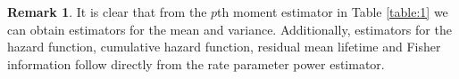 \documentclass[12pt]{article}
\theoremstyle{definition}
\newtheorem{remark}[theorem]{Remark}
\begin{document}
{\begin{table}[H]
{
}
\end{table}
}

\begin{remark}
	It is clear that from the $p$th moment estimator in Table 	\ref{table:1} we can obtain estimators for the mean and variance.
	Additionally, estimators for the hazard function, cumulative hazard function, residual mean lifetime and Fisher information follow directly from the rate parameter power estimator.
\end{remark}
\end{document}
